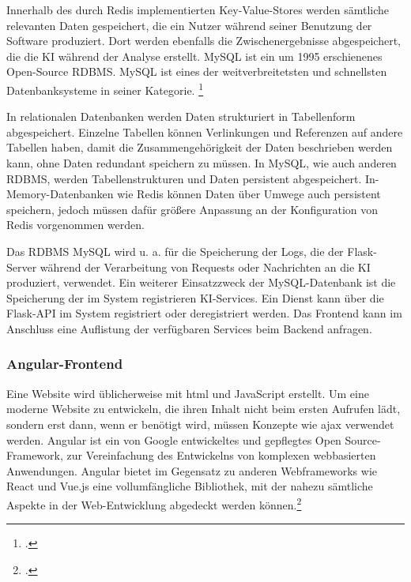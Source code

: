 Innerhalb des durch Redis implementierten Key-Value-Stores werden sämtliche relevanten Daten gespeichert, die ein Nutzer während seiner Benutzung der Software produziert. Dort werden ebenfalls die Zwischenergebnisse abgespeichert, die die KI während der Analyse erstellt.
%
MySQL ist ein um 1995 erschienenes Open-Source RDBMS. MySQL ist eines der weitverbreitetsten und schnellsten Datenbanksysteme in seiner Kategorie. \footcite{dubois2008mysql}

In relationalen Datenbanken werden Daten strukturiert in Tabellenform abgespeichert. Einzelne Tabellen können Verlinkungen und Referenzen auf andere Tabellen haben, damit die Zusammengehörigkeit der Daten beschrieben werden kann, ohne Daten redundant speichern zu müssen. In MySQL, wie auch anderen RDBMS, werden Tabellenstrukturen und Daten persistent abgespeichert. In-Memory-Datenbanken wie Redis können Daten über Umwege auch persistent speichern, jedoch müssen dafür größere Anpassung an der Konfiguration von Redis vorgenommen werden.

Das RDBMS MySQL wird u. a. für die Speicherung der Logs, die der Flask-Server während der Verarbeitung von Requests oder Nachrichten an die KI produziert, verwendet. Ein weiterer Einsatzzweck der MySQL-Datenbank ist die Speicherung der im System registrieren KI-Services. Ein Dienst kann über die Flask-API im System registriert oder deregistriert werden. Das Frontend kann im Anschluss eine Auflistung der verfügbaren Services beim Backend anfragen.

\subsubsection{Angular-Frontend}
Eine Website wird üblicherweise mit \ac{html} und JavaScript erstellt. Um eine moderne Website zu entwickeln, die ihren Inhalt nicht beim ersten Aufrufen lädt, sondern erst dann, wenn er benötigt wird, müssen Konzepte wie \ac{ajax} verwendet werden. Angular ist ein von Google entwickeltes und gepflegtes Open Source-Framework, zur Vereinfachung des Entwickelns von komplexen webbasierten Anwendungen. Angular bietet im Gegensatz zu anderen Webframeworks wie React und Vue.js eine vollumfängliche Bibliothek, mit der nahezu sämtliche Aspekte in der Web-Entwicklung abgedeckt werden können.\footcite{moiseev2018angular}

